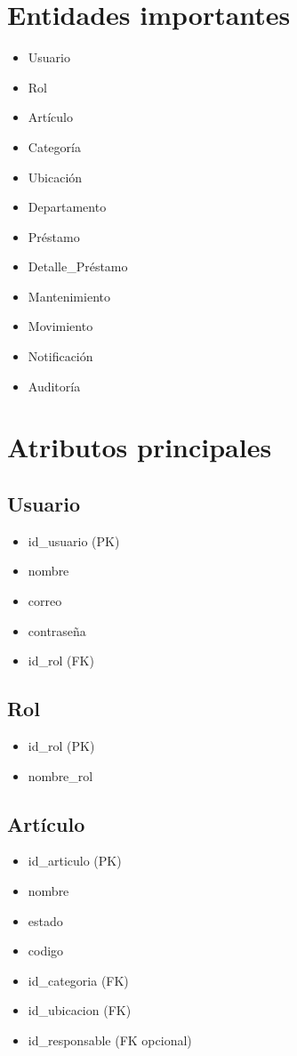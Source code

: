 \documentclass{article}
\begin{document}
\section{Entidades importantes}

\begin{itemize}[leftmargin=1.5cm]
    \item Usuario
    \item Rol
    \item Artículo
    \item Categoría
    \item Ubicación
    \item Departamento
    \item Préstamo
    \item Detalle\_Préstamo
    \item Mantenimiento
    \item Movimiento
    \item Notificación
    \item Auditoría
\end{itemize}

\section{Atributos principales}

\subsection{Usuario}
\begin{itemize}
    \item id\_usuario (PK)
    \item nombre
    \item correo
    \item contraseña
    \item id\_rol (FK)
\end{itemize}

\subsection{Rol}
\begin{itemize}
    \item id\_rol (PK)
    \item nombre\_rol
\end{itemize}

\subsection{Artículo}
\begin{itemize}
    \item id\_articulo (PK)
    \item nombre
    \item estado
    \item codigo
    \item id\_categoria (FK)
    \item id\_ubicacion (FK)
    \item id\_responsable (FK opcional)
\end{itemize}
\end{document}
